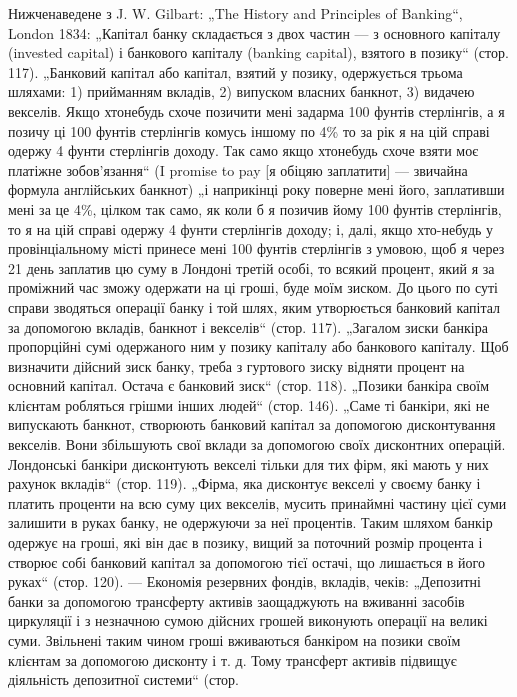 Нижченаведене з J. W. Gilbart: „The History and Principles of Banking“,
London 1834: „Капітал банку складається з двох частин — з основного капіталу
(invested capital) і банкового капіталу (banking capital), взятого в позику“ (стор. 117).
„Банковий капітал або капітал, взятий у позику, одержується трьома шляхами:
1) прийманням вкладів, 2) випуском власних банкнот, 3) видачею векселів. Якщо
хтонебудь схоче позичити мені задарма 100 фунтів стерлінгів, а я позичу ці
100 фунтів стерлінгів комусь іншому по 4\% то за рік я на цій справі одержу
4 фунти стерлінгів доходу. Так само якщо хтонебудь схоче взяти моє платіжне
зобов’язання“ (I promise to pay [я обіцяю заплатити] — звичайна формула англійських банкнот) „і
наприкінці року поверне мені його, заплативши мені за це 4\%, цілком так само, як коли б я позичив
йому 100 фунтів стерлінгів, то я на цій справі одержу 4 фунти стерлінгів доходу; і, далі, якщо
хто-небудь у провінціальному місті принесе мені 100 фунтів стерлінгів з умовою, щоб я через 21 день
заплатив цю суму в Лондоні третій особі, то всякий процент, який я за проміжний час зможу одержати
на ці гроші, буде моїм зиском. До цього по суті справи зводяться операції банку і той шлях, яким
утворюється банковий капітал за допомогою вкладів, банкнот і векселів“ (стор. 117). „Загалом зиски
банкіра пропорційні сумі одержаного ним у позику капіталу або банкового капіталу. Щоб визначити
дійсний зиск банку, треба з гуртового зиску відняти процент на основний капітал. Остача є банковий
зиск“ (стор. 118). „Позики банкіра своїм клієнтам робляться грішми інших людей“ (стор. 146). „Саме
ті банкіри, які не випускають банкнот, створюють банковий капітал за допомогою дисконтування
векселів. Вони збільшують свої вклади за допомогою своїх дисконтних операцій. Лондонські банкіри
дисконтують векселі тільки для тих фірм, які мають у них рахунок вкладів“ (стор. 119). „Фірма, яка
дисконтує векселі у своєму банку і платить проценти на всю суму цих векселів, мусить принаймні
частину цієї суми залишити
в руках банку, не одержуючи за неї процентів. Таким шляхом банкір одержує на гроші, які він дає в
позику, вищий за поточний розмір процента і
створює собі банковий капітал за допомогою тієї остачі, що лишається в його руках“ (стор. 120). —
Економія резервних фондів, вкладів, чеків: „Депозитні банки за
допомогою трансферту активів заощаджують на вживанні засобів циркуляції і з
незначною сумою дійсних грошей виконують операції на великі суми. Звільнені таким чином гроші
вживаються банкіром на позики своїм клієнтам за
допомогою дисконту і т. д. Тому трансферт активів підвищує діяльність депозитної системи“ (стор.
